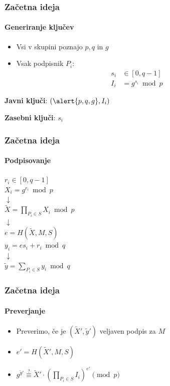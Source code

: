 \documentclass{beamer}    %
\begin{document}
\begin{frame}
    \frametitle{Začetna ideja}
    \framesubtitle{Generiranje ključev}
    \begin{itemize}
        \item Vsi v skupini poznajo \alert{$p, q$} in \alert{$g$}
        \item Vsak podpisnik $P_i$: 
            \begin{align*}
                s_i &\in [0, q-1] \\
                I_i &= g^{s_i} \bmod{p}
            \end{align*}
    \end{itemize}
    \vspace{1cm}
    \begin{multicols*}{2}
        \textbf{Javni ključi}: $(\alert{p, q, g}, I_i)$
        \columnbreak

        \textbf{Zasebni ključi}: $s_i$
    \end{multicols*}
\end{frame}

\begin{frame}
    \frametitle{Začetna ideja}
    \framesubtitle{Podpisovanje}
    \begin{center}
        $r_i \in [0, q-1]$ \\
        $X_i = g^{r_i} \bmod{p}$ \\
        \vspace{0.25cm}
        $\downarrow$ \\
        \vspace{0.25cm}
        $\tilde{X} = \prod_{P_i \in S} X_i \bmod{p}$ \\
        \vspace{0.25cm}
        $\downarrow$ \\
        \vspace{0.25cm}
        $e = H(\tilde{X}, M, S)$ \\
        $y_i = e s_i + r_i \bmod{q}$ \\
        \vspace{0.25cm}
        $\downarrow$ \\
        \vspace{0.25cm}
        $\tilde{y} = \sum_{P_i \in S} y_i \bmod{q}$ \\
    \end{center}
\end{frame}

\begin{frame}
    \frametitle{Začetna ideja}
    \framesubtitle{Preverjanje}
    \begin{itemize}
        \item Preverimo, če je $(\tilde{X}', \tilde{y}')$ veljaven podpis za $M$
        \item $e' = H(\tilde{X}', M, S)$
        \item $g^{\tilde{y}'} \stackrel{?}{\equiv} \tilde{X}' \cdot (\prod_{P_i \in S} I_i)^{e'} \pmod{p}$   
    \end{itemize}
\end{frame}
\end{document}

